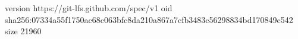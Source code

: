 version https://git-lfs.github.com/spec/v1
oid sha256:07334a55f1750ac68c063bfc8da210a867a7cfb3483c56298834bd170849c542
size 21960

